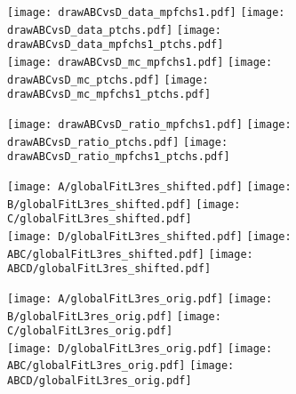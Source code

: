 \documentclass[landscape,10pt]{beamer} %
\begin{document}
\newpage
\begin{figure}[p]
\centering
  \texttt{[image: drawABCvsD\_data\_mpfchs1.pdf]}
  \texttt{[image: drawABCvsD\_data\_ptchs.pdf]}
  \texttt{[image: drawABCvsD\_data\_mpfchs1\_ptchs.pdf]}\\
  \texttt{[image: drawABCvsD\_mc\_mpfchs1.pdf]}
  \texttt{[image: drawABCvsD\_mc\_ptchs.pdf]}
  \texttt{[image: drawABCvsD\_mc\_mpfchs1\_ptchs.pdf]}\\
\end{figure}

\newpage
\begin{figure}[p]
\centering
  \texttt{[image: drawABCvsD\_ratio\_mpfchs1.pdf]}
  \texttt{[image: drawABCvsD\_ratio\_ptchs.pdf]}
  \texttt{[image: drawABCvsD\_ratio\_mpfchs1\_ptchs.pdf]}
\end{figure}



\newpage

\begin{figure}[p]
\centering
  \texttt{[image: A/globalFitL3res\_shifted.pdf]}
  \texttt{[image: B/globalFitL3res\_shifted.pdf]}
  \texttt{[image: C/globalFitL3res\_shifted.pdf]}\\
  \texttt{[image: D/globalFitL3res\_shifted.pdf]}
  \texttt{[image: ABC/globalFitL3res\_shifted.pdf]}
  \texttt{[image: ABCD/globalFitL3res\_shifted.pdf]}
\end{figure}

\newpage 

\begin{figure}[p]
\centering
  \texttt{[image: A/globalFitL3res\_orig.pdf]}
  \texttt{[image: B/globalFitL3res\_orig.pdf]}
  \texttt{[image: C/globalFitL3res\_orig.pdf]}\\
  \texttt{[image: D/globalFitL3res\_orig.pdf]}
  \texttt{[image: ABC/globalFitL3res\_orig.pdf]}
  \texttt{[image: ABCD/globalFitL3res\_orig.pdf]}
\end{figure}

\newpage
\end{document}
